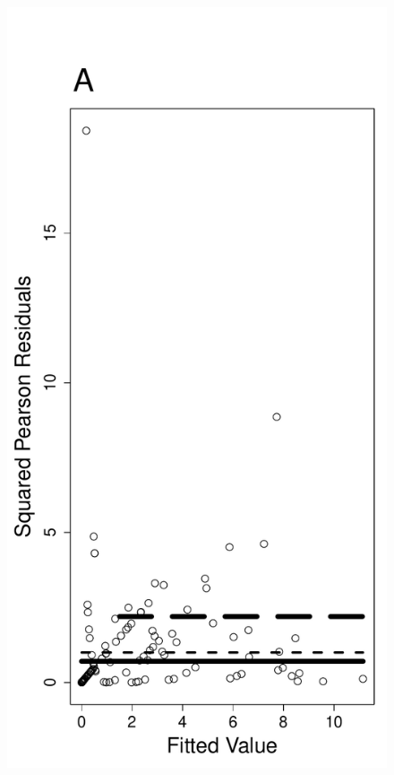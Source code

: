 \documentclass[12pt, titlepage]{article}\usepackage[]{graphicx}\usepackage[]{color}
\makeatletter
\def\maxwidth{ %
  \ifdim\Gin@nat@width>\linewidth
    \linewidth
  \else
    \Gin@nat@width
  \fi
}
\makeatother
\begin{document}
		\begin{figure}[H]
		\begin{center}
		\includegraphics[width = .40\maxwidth]{figure/PearResids4Overdisp}

\end{center}
\end{figure}
\end{document}
